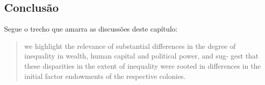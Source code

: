 \subsection*{Conclusão}
 
 Segue o trecho que amarra as discussões deste capítulo:
 
 \begin{quotation}
 	we highlight the relevance of substantial differences in the
 	degree of inequality in wealth, human capital and political power, and sug-
 	gest that these disparities in the extent of inequality were rooted in differences
 	in the initial factor endowments of the respective colonies. 
 \end{quotation}
 
 